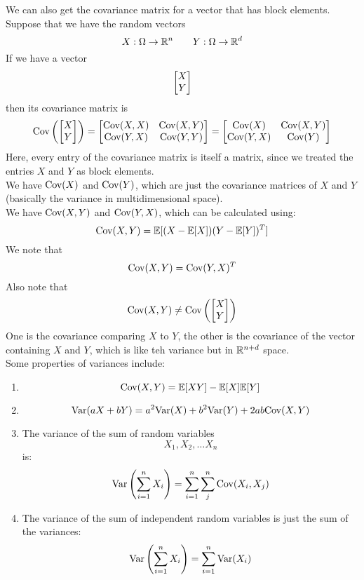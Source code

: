 \documentclass[12pt]{article}
\begin{document}
    We can also get the covariance
    matrix for a vector that has
    block elements. \\
    Suppose that we have the random vectors
    \[ X: \Omega \to \mathbb{R}^n
    \qquad Y: \Omega \to \mathbb{R}^d \]
    If we have a vector
    \[ \begin{bmatrix} {X} \\ {Y} \end{bmatrix} \]
    then its covariance matrix is
    \[ \text{Cov}\left( \begin{bmatrix} {X} \\ {Y} \end{bmatrix} \right)
    = \begin{bmatrix} {\text{Cov}(X, X)} & {\text{Cov}(X, Y)} \\
    {\text{Cov}(Y, X)} &{\text{Cov}(Y, Y)} \end{bmatrix}
    = \begin{bmatrix} {\text{Cov}(X)} & {\text{Cov}(X, Y)} \\
    {\text{Cov}(Y, X)} & {\text{Cov}(Y)} \end{bmatrix} \]
    Here, every entry of the covariance
    matrix is itself a matrix,
    since we treated the entries
    $X$ and $Y$ as block elements. \\
    We have $\text{Cov}(X)$ and $\text{Cov}(Y)$,
    which are just the covariance 
    matrices of $X$ and $Y$
    (basically the variance in
    multidimensional space). \\
    We have $\text{Cov}(X, Y)$
    and $\text{Cov}(Y, X)$,
    which can be calculated
    using:
    \[ \text{Cov}(X, Y) = 
    \mathbb{E}[(X - \mathbb{E}[X])(Y - \mathbb{E}[Y])^T] \]
    We note that
    \[ \text{Cov}(X, Y) = 
    \text{Cov}(Y, X)^T \]
    Also note that
    \[ \text{Cov}(X, Y) \neq 
    \text{Cov}\left( \begin{bmatrix} {X} \\ {Y} \end{bmatrix} \right) \]
    One is the covariance comparing
    $X$ to $Y$,
    the other is the covariance of the
    vector containing $X$ and $Y$,
    which is like teh variance but in
    $\mathbb{R}^{n + d}$ space. \\

    Some properties of variances include:
    \begin{enumerate}
        \item 
        \[ \text{Cov}(X, Y) = \mathbb{E}[XY] - \mathbb{E}[X]\mathbb{E}[Y] \]
        \item
        \[ \text{Var}(aX + bY)
        = a^2\text{Var}(X) + b^2\text{Var}(Y)
        + 2ab\text{Cov}(X, Y) \]
        \item
        The variance of the sum
        of random variables
        \[ X_1, X_2, \dots X_n \]
        is:
        \[ \text{Var}\left( \sum_{i=1}^{n}X_i \right)
        = \sum_{i=1}^{n}\sum_{j}^{n}
        \text{Cov}(X_i, X_j) \]
        \item
        The variance of the sum of
        independent random variables is
        just the sum of the variances:
        \[ \text{Var}\left( \sum_{i=1}^{n}X_i \right)
        = \sum_{i=1}^{n} \text{Var}(X_i) \] \\
    \end{enumerate}
\end{document}

